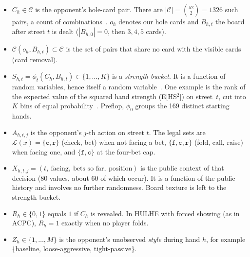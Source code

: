 \documentclass[11pt,a4paper]{article}
\newcommand{\C}{C}            %
\newcommand{\Sb}{S}           %
\newcommand{\Z}{Z}            %
\newcommand{\A}{A}            %
\newcommand{\X}{X}            %
\newcommand{\B}{B}            %
\newcommand{\R}{R}            %
\newcommand{\1}{\mathbf{1}}
\newcommand{\BT}[1]{\cite[§#1]{bertsekas2000}}
\begin{document}
\begin{itemize}
  \item $\C_h\in\mathcal{C}$ is the opponent's hole-card pair. There are
        $|\mathcal{C}|=\binom{52}{2}=1326$ such pairs, a count of
        combinations~\BT{1.6}. $o_h$ denotes our hole cards and $\B_{h,t}$ the
        board after street $t$ is dealt ($|\B_{h,0}|=0$, then $3,4,5$ cards).
  \item $\mathcal{C}(o_h,\B_{h,t})\subset\mathcal{C}$ is the set of pairs that
        share no card with the visible cards (card removal).
  \item $\Sb_{h,t}=\phi_t(\C_h,\B_{h,t})\in\{1,\dots,K\}$ is a \emph{strength
        bucket}. It is a function of random variables, hence itself a random
        variable~\BT{2.3}. One example is the rank of the expected value of the
        squared hand strength (E[HS$^2$]) on street~$t$, cut into $K$ bins of
        equal probability~\cite{johanson2013}. Preflop, $\phi_0$ groups the 169
        distinct starting hands.
  \item $\A_{h,t,j}$ is the opponent's $j$-th action on street $t$. The legal
        sets are $\mathcal{L}(x)=\{\mathtt{c},\mathtt{r}\}$ (check, bet) when
        not facing a bet, $\{\mathtt{f},\mathtt{c},\mathtt{r}\}$ (fold, call,
        raise) when facing one, and $\{\mathtt{f},\mathtt{c}\}$ at the four-bet
        cap.
  \item $\X_{h,t,j}=(t,\ \text{facing},\ \text{bets so far},\ \text{position})$
        is the public context of that decision (80 values, about 60 of which
        occur). It is a function of the public history and involves no further
        randomness. Board texture is left to the strength bucket.
  \item $\R_h\in\{0,1\}$ equals $1$ if $\C_h$ is revealed. In HULHE with forced
        showing (as in ACPC), $\R_h=1$ exactly when no player folds.
  \item $\Z_h\in\{1,\dots,M\}$ is the opponent's unobserved \emph{style} during
        hand $h$, for example \{baseline, loose-aggressive, tight-passive\}.
\end{itemize}
\end{document}
